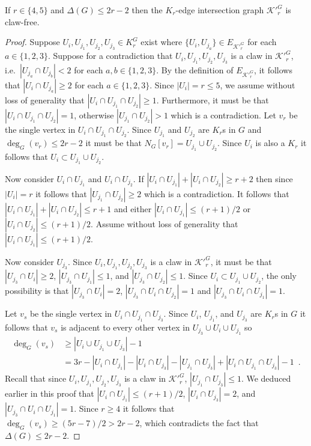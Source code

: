 \begin{lem}
\label{lem:krpacking_edgedisjoint_r45}
If $r\in \{ 4, 5 \}$ and $\Delta(G) \leq 2r - 2$ then the $K_r$-edge intersection graph ${\mathcal{K}'}_r^G$ is claw-free.
\end{lem}
\begin{proof}
Suppose $U_i, U_{j_1}, U_{j_2}, U_{j_3} \in K_r^G$ exist where $\{ U_i, U_{j_a} \} \in E_{{\mathcal{K}'}_r^G}$ for each $a \in \{1, 2, 3\}$. Suppose for a contradiction that $U_i, U_{j_1}, U_{j_2}, U_{j_3}$ is a claw in ${\mathcal{K}'}_r^G$, i.e.\ $|U_{j_a} \cap U_{j_b}| < 2$ for each $a, b \in \{ 1, 2, 3 \}$. By the definition of $E_{{\mathcal{K}'}_r^G}$, it follows that $|U_i \cap U_{j_a}| \geq 2$ for each $a \in \{ 1, 2, 3 \}$. Since $|U_i| = r \leq 5$, we assume without loss of generality that $|U_i \cap U_{j_1} \cap U_{j_2}| \geq 1$. Furthermore, it must be that $|U_i \cap U_{j_1} \cap U_{j_2}| = 1$, otherwise $|U_{j_1} \cap U_{j_2}| > 1$ which is a contradiction.  Let $v_r$ be the single vertex in $U_i \cap U_{j_1} \cap U_{j_2}$. Since $U_{j_1}$ and $U_{j_2}$ are $K_r$s in $G$ and $\deg_{G}(v_r) \leq 2r-2$ it must be that $N_{G}[v_r]=U_{j_1} \cup U_{j_2}$. Since $U_i$ is also a $K_r$ it follows that $U_i \subset U_{j_1} \cup U_{j_2}$. 

Now consider $U_i \cap U_{j_1}$ and $U_i \cap U_{j_2}$. If $|U_i \cap U_{j_1}| + |U_i \cap U_{j_2}| \geq r+2$ then since $|U_i|=r$ it follows that $|U_{j_1} \cap U_{j_2}| \geq 2$ which is a contradiction. It follows that $|U_i \cap U_{j_1}| + |U_i \cap U_{j_2}| \leq r + 1$ and either $|U_i \cap U_{j_1}| \leq (r+1)/2$ or $|U_i \cap U_{j_2}| \leq (r+1)/2$. Assume without loss of generality that $|U_i \cap U_{j_1}| \leq (r+1)/2$. 

Now consider $U_{j_3}$. Since $U_i, U_{j_1}, U_{j_2}, U_{j_3}$ is a claw in ${\mathcal{K}'}_r^G$, it must be that $|U_{j_3} \cap U_{i}| \geq 2$, $|U_{j_3} \cap U_{j_1}| \leq 1$, and $|U_{j_3} \cap U_{j_2}| \leq 1$. Since $U_i \subset U_{j_1} \cup U_{j_2}$, the only possibility is that $|U_{j_3} \cap U_i| = 2$, $|U_{j_3} \cap U_i \cap U_{j_2}| = 1$ and $|U_{j_3} \cap U_i \cap U_{j_1}| = 1$. 

Let $v_s$ be the single vertex in $U_{i} \cap U_{j_1} \cap U_{j_3}$. Since $U_i$, $U_{j_1}$, and $U_{j_3}$ are $K_r$s in $G$ it follows that $v_s$ is adjacent to every other vertex in $U_{j_3} \cup U_{i} \cup U_{j_1}$ so
\begin{align*}
    \deg_{G}(v_s) &\geq |U_i \cup U_{j_1} \cup U_{j_3}| - 1\\
    &= 3r - |U_i \cap U_{j_1}| - |U_{i} \cap U_{j_3}| - |U_{j_1} \cap U_{j_3}| + |U_i \cap U_{j_1} \cap U_{j_3}| - 1\enspace.
\end{align*}
Recall that since $U_i, U_{j_1}, U_{j_2}, U_{j_3}$ is a claw in ${\mathcal{K}'}_r^G$, $|U_{j_1} \cap U_{j_3}| \leq 1$. We deduced earlier in this proof that $|U_i \cap U_{j_1}| \leq (r+1)/2$, $|U_i \cap U_{j_3}| = 2$, and $|U_{j_3} \cap U_i \cap U_{j_1}| = 1$. Since $r \geq 4$ it follows that $\deg_{G}(v_s) \geq (5r-7)/2 > 2r - 2$, which contradicts the fact that $\Delta(G) \leq 2r - 2$.
\end{proof}

